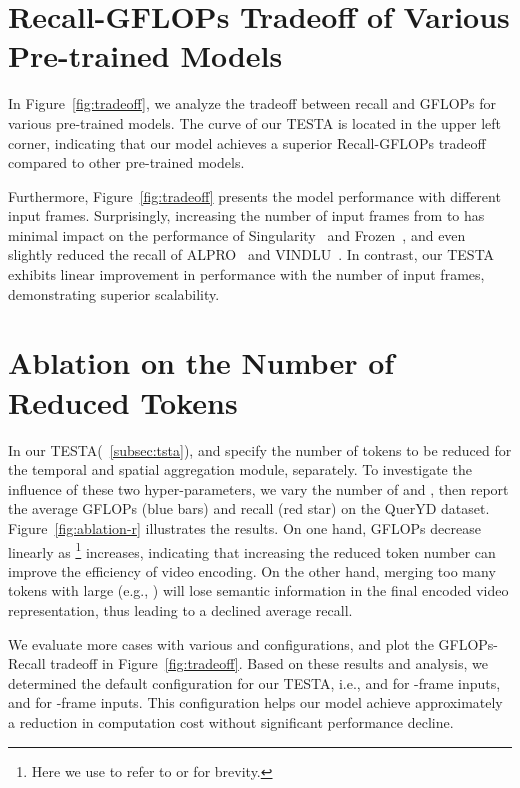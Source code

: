 \documentclass[11pt]{article}
\newcommand{\modelname}{TESTA\xspace}
\begin{document}
\section{Recall-GFLOPs Tradeoff of Various Pre-trained Models}
\label{sec:tradeoff}
In Figure~\ref{fig:tradeoff}, we analyze the tradeoff between recall and GFLOPs for various pre-trained models. The curve of our \modelname is located in the upper left corner, indicating that our model achieves a superior Recall-GFLOPs tradeoff compared to other pre-trained models. 

Furthermore, Figure~\ref{fig:tradeoff} presents the model performance with different input frames.  Surprisingly, increasing the number of input frames from  to  has minimal impact on the performance of Singularity~\citep{Lei2022RevealingSF} and Frozen~\citep{Bain2021FrozenIT}, and even slightly reduced the recall of ALPRO~\citep{Li2021AlignAP} and VINDLU~\citep{Cheng2022VindLUAR}. 
In contrast, our \modelname exhibits linear improvement in performance with the number of input frames, demonstrating superior scalability.


\section{Ablation on the Number of Reduced Tokens}
\label{sec:more-ablation}

In our \modelname (\textsection~\ref{subsec:tsta}),  and  specify the number of tokens to be reduced for the temporal and spatial aggregation module, separately. To investigate the influence of these two hyper-parameters, we vary the number of  and , then report the average GFLOPs (blue bars) and recall (red star) on the QuerYD dataset. 
Figure~\ref{fig:ablation-r} illustrates the results. 
On one hand, GFLOPs decrease linearly as \footnote{Here we use  to refer to  or  for brevity.} increases, indicating that increasing the reduced token number can improve the efficiency of video encoding. 
On the other hand, merging too many tokens with large  (e.g., ) will lose semantic information in the final encoded video representation, thus leading to a declined average recall.~ 


We evaluate more cases with various  and  configurations, and plot the GFLOPs-Recall tradeoff in Figure~\ref{fig:tradeoff}. 
Based on these results and analysis, we determined the default configuration for our \modelname, i.e.,  and for -frame inputs, and  for -frame inputs. This configuration helps our model achieve approximately a  reduction in computation cost without significant performance decline.~ 
\end{document}
